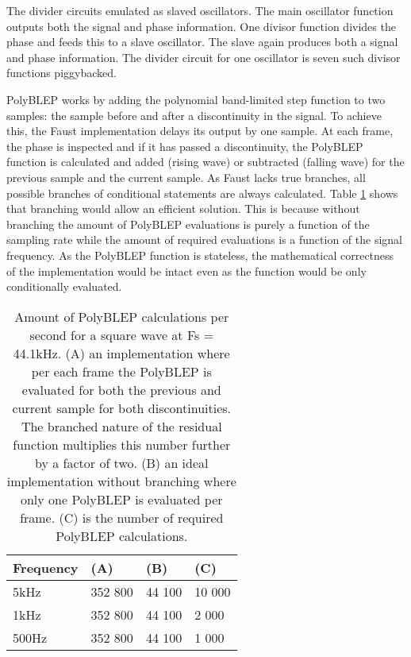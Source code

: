 \documentclass[11pt,a4paper]{article}
\begin{document}
The divider circuits emulated as slaved oscillators. The main oscillator function outputs both the signal and phase information. One divisor function divides the phase and feeds this to a slave oscillator. The slave again produces both a signal and phase information. The divider circuit for one oscillator is seven such divisor functions piggybacked.

PolyBLEP works by adding the polynomial band-limited step function to two samples: the sample before and after a discontinuity in the signal. To achieve this, the Faust implementation delays its output by one sample. At each frame, the phase is inspected and if it has passed a discontinuity, the PolyBLEP function is calculated and added (rising wave) or subtracted (falling wave) for the previous sample and the current sample. As Faust lacks true branches, all possible branches of conditional statements are always calculated. Table \ref{table:polyblep-amount} shows that branching would allow an efficient solution. This is because without branching the amount of PolyBLEP evaluations is purely a function of the sampling rate while the amount of required evaluations is a function of the signal frequency. As the PolyBLEP function is stateless, the mathematical correctness of the implementation would be intact even as the function would be only conditionally evaluated.

\begin{table}[h]
 \begin{center}
\begin{tabular}{|l|l|l|l|}

      \hline
      Frequency & (A)        &  (B)         & (C) \\
      \hline\hline
      5kHz     & 352 800     & 44 100       & 10 000\\
      1kHz     & 352 800     & 44 100       &  2 000\\
      500Hz    & 352 800     & 44 100       &  1 000\\
      \hline

\end{tabular}
\caption{Amount of PolyBLEP calculations per second for a square wave at Fs = 44.1kHz. 
(A) an implementation where per each frame the PolyBLEP is evaluated for both the previous and current sample for both discontinuities. The branched nature of the residual function multiplies this number further by a factor of two.
(B) an ideal implementation without branching where only one PolyBLEP is evaluated per frame.
(C) is the number of required PolyBLEP calculations.  }\label{table:polyblep-amount}
 \end{center}
\end{table}
\end{document}

